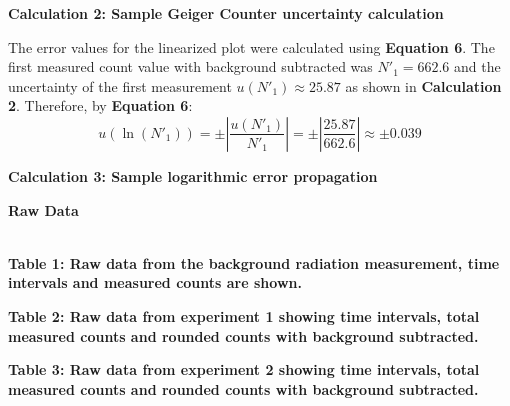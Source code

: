 \documentclass[
	letterpaper, %
	10pt, %
]{CSUniSchoolLabReport}
\begin{document}
\begin{center}
	\textbf{Calculation 2: Sample Geiger Counter uncertainty calculation}
\end{center}
\vspace{10pt}
The error values for the linearized plot were calculated using \textbf{Equation 6}. The first measured count value with background subtracted was $N'_{1} = 662.6$ and the uncertainty of the first measurement $u(N'_1) \approx 25.87$ as shown in \textbf{Calculation 2}. Therefore, by \textbf{Equation 6}:
$$u(\ln(N'_1))= \pm\left|\frac{u(N'_1)}{N'_1}\right|= \pm\left|\frac{25.87}{662.6}\right| \approx \pm0.039$$
\begin{center}
	\textbf{Calculation 3: Sample logarithmic error propagation}
\end{center}
\newpage
{\Large\textbf{Raw Data}}\\
\vspace{20pt}\\
\begin{center}

\end{center}
\begin{center}
	\textbf{Table 1: Raw data from the background radiation measurement, time intervals and measured counts are shown.}
\end{center}

\begin{center}
	\textbf{Table 2: Raw data from experiment 1 showing time intervals, total measured counts and rounded counts with background subtracted.}
\end{center}

\begin{center}
	\textbf{Table 3: Raw data from experiment 2 showing time intervals, total measured counts and rounded counts with background subtracted.}
\end{center}
\end{document}
